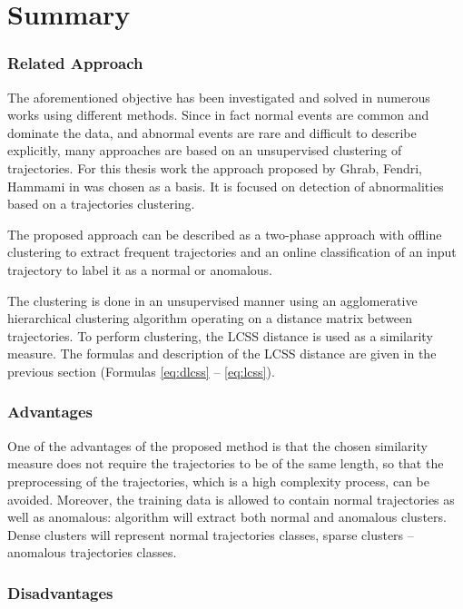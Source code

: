 \section{Summary}

\subsubsection{Related Approach}

The aforementioned objective has been investigated and solved in numerous works using different methods. Since in fact normal events are common and dominate the data, and abnormal events are rare and difficult to describe explicitly, many approaches are based on an unsupervised clustering of trajectories. For this thesis work the approach proposed by Ghrab, Fendri, Hammami in \cite{inproceedings:7_related_work} was chosen as a basis. It is focused on detection of abnormalities based on a trajectories clustering.

The proposed approach can be described as a two-phase approach with offline clustering to extract frequent trajectories and an online classification of an input trajectory to label it as a normal or anomalous.

The clustering is done in an unsupervised manner using an agglomerative hierarchical clustering algorithm operating on a distance matrix between trajectories. To perform clustering, the LCSS distance is used as a similarity measure. The formulas and description of the LCSS distance are given in the previous section (Formulas \ref{eq:dlcss} -- \ref{eq:lcss}).

\subsubsection{Advantages}

One of the advantages of the proposed method is that the chosen similarity measure does not require the trajectories to be of the same length, so that the preprocessing of the trajectories, which is a high complexity process, can be avoided. Moreover, the training data is allowed to contain normal trajectories as well as anomalous: algorithm will extract both normal and anomalous clusters. Dense clusters will represent normal trajectories classes, sparse clusters – anomalous trajectories classes.

\subsubsection{Disadvantages}

